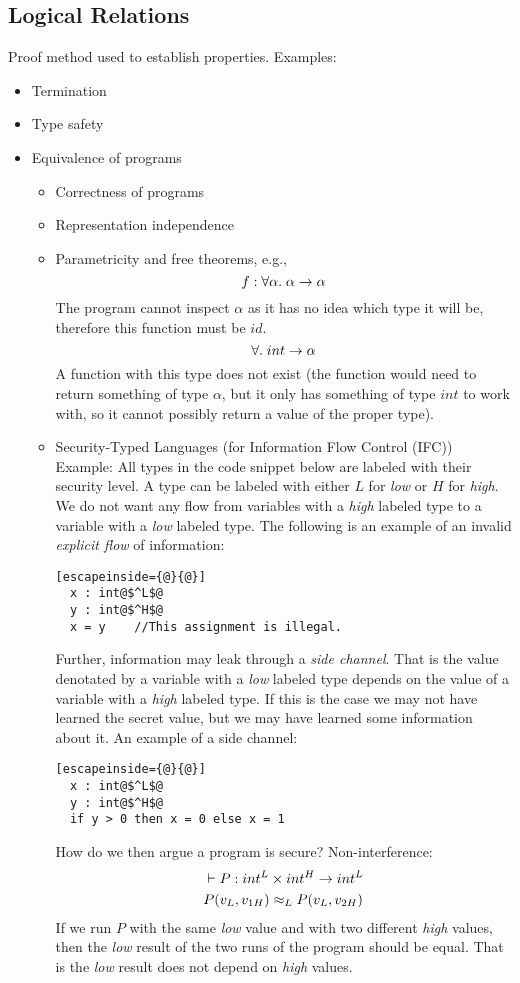 \subsection*{Logical Relations}
Proof method used to establish properties. Examples:
\begin{itemize}
\item Termination
\item Type safety
\item Equivalence of programs
  \begin{itemize}
  \item Correctness of programs
  \item Representation independence
  \item Parametricity and free theorems, e.g.,
    \[
    f: \forall \alpha. \;  \alpha \rightarrow \alpha
    \]
    The program cannot inspect $\alpha$ as it has no idea which type it will be, therefore this function must be $id$.
    \[
    \forall. \;  int \rightarrow \alpha
    \]
    A function with this type does not exist (the function would need to return something of type $\alpha$, but it only has something of type $int$ to work with, so it cannot possibly return a value of the proper type).
  \item Security-Typed Languages (for Information Flow Control (IFC))\\
        Example: All types in the code snippet below are labeled with their security level. A type can be labeled with either $L$ for \emph{low} or $H$ for \emph{high}. We do not want any flow from variables with a \emph{high} labeled type to a variable with a \emph{low} labeled type. The following is an example of an invalid \emph{explicit flow} of information:
        \begin{lstlisting}[escapeinside={@}{@}]
  x : int@$^L$@
  y : int@$^H$@
  x = y    //This assignment is illegal.
        \end{lstlisting}
Further, information may leak through a \emph{side channel}. That is the value denotated by a variable with a \emph{low} labeled type depends on the value of a variable with a \emph{high} labeled type. If this is the case we may not have learned the secret value, but we may have learned some information about it. An example of a side channel:
        \begin{lstlisting}[escapeinside={@}{@}]
  x : int@$^L$@
  y : int@$^H$@
  if y > 0 then x = 0 else x = 1
        \end{lstlisting}
How do we then argue a program is secure? Non-interference:
\begin{align*}
  & \vdash P :  int^L \times int^H \rightarrow int^L \\
  & P(v_L,v_{1H}) \approx_L P(v_L,v_{2H})
\end{align*}
If we run $P$ with the same \emph{low} value and with two different \emph{high} values, then the \emph{low} result of the two runs of the program should be equal. That is the \emph{low} result does not depend on \emph{high} values.
  \end{itemize}
\end{itemize}

